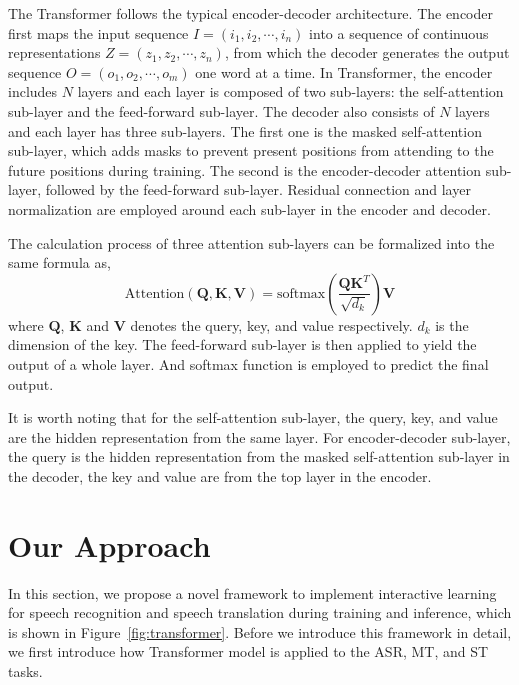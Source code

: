 \documentclass[letterpaper]{article} %
\begin{document}
The Transformer follows the typical encoder-decoder architecture. The encoder first maps the input sequence $\mathbf{\mathit{I}}=(i_1,i_2,\cdots,i_n)$ into a sequence of continuous representations $\mathbf{\mathit{Z}}=(z_1,z_2,\cdots,z_n)$, from which  the decoder generates the output sequence $\mathbf{\mathit{O}}=(o_1,o_2,\cdots,o_m)$ one word at a time. In Transformer, the encoder includes $N$ layers and each layer is composed of two sub-layers: the self-attention sub-layer and the feed-forward sub-layer.
The decoder also consists of $N$ layers and each layer has three sub-layers. The first one is the masked self-attention sub-layer, which adds masks to prevent present positions from attending to the future positions during training. The second is the encoder-decoder attention sub-layer, followed by the feed-forward sub-layer. Residual connection and layer normalization are employed around each sub-layer in the encoder and decoder.

The calculation process of three attention sub-layers can be formalized into the same formula as, 
\begin{equation}
\mathrm{Attention(\mathbf{Q},\mathbf{K},\mathbf{V})}=\mathrm{softmax}(\frac{\mathbf{Q}\mathbf{K}^T}{\sqrt{d_k}})\mathbf{V} 
\label{equ:Attention}
\end{equation}
where $\mathbf{Q}$, $\mathbf{K}$ and $\mathbf{V}$ denotes the query, key, and value respectively. $d_k$ is the dimension of the key.
The feed-forward sub-layer is then applied to yield the output of a whole layer. And softmax function is employed to predict the final output.

It is worth noting that for the self-attention sub-layer, the query, key, and value are the hidden representation from the same layer. For encoder-decoder sub-layer, the query is the hidden representation from the masked self-attention sub-layer in the decoder, the key and value are from the top layer in the encoder. 

\section{Our Approach}
In this section, we propose a novel framework to implement interactive learning for speech recognition and speech translation during training and inference, which is shown in Figure~\ref{fig:transformer}. Before we introduce this framework in detail, we first introduce how Transformer model is applied to the ASR, MT, and ST tasks.
\end{document}
